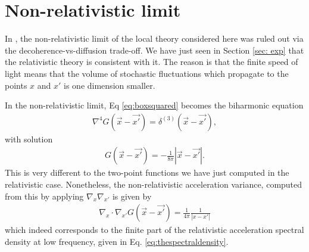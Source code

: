 \documentclass[aps,preprintnumbers,superscriptaddress,longbibliography]{revtex4-1}
\begin{document}

\section{Non-relativistic limit}

In \cite{oppenheim2022gravitationally}, the non-relativistic limit of the local theory considered here was ruled out via the decoherence-vs-diffusion trade-off. We have just seen in Section \ref{sec: exp} that the relativistic theory is consistent with it. The reason is that the finite speed of light means that the volume of stochastic fluctuations which propagate to the points $x$ and $x'$ is one dimension smaller. 

In the non-relativistic limit, Eq \eqref{eq:boxsquared} becomes the biharmonic equation 
\begin{align}
    \nabla^4 G(\vec{x}-\vec{x'})=\delta^{(3)}(\vec{x}-\vec{x'}),
    \label{eq:biharmonic}
\end{align}
with solution~\cite{grunau2010positivity}
\begin{align}
    G(\vec{x}-\vec{x'})=-\frac{1}{8 \pi}|\vec{x}-\vec{x'}|.
    \label{eq:freedom}
\end{align}
This is very different to the two-point functions we have just computed in the relativistic case.
Nonetheless, the non-relativistic acceleration variance, computed from this by applying $\nabla_x\nabla_{x'}$ is given by
\begin{align}
    \nabla_x\cdot\nabla_{x'}G(\vec{x}-\vec{x'})=\frac{1}{4\pi}\frac{1}{|x-x'|}
\end{align}
which indeed corresponds to the finite part of the relativistic acceleration spectral density at low frequency, given in Eq. \eqref{eq:thespectraldensity}.
\end{document}
